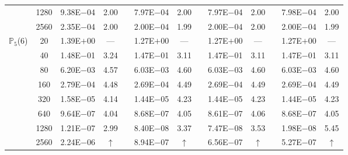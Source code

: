\begin{table}[H]
{\begin{tabular}{@{}l c c c c c c c c c c c c@{}}
 & 1280 & 9.38E$-$04 & 2.00 &  & 7.97E$-$04 & 2.00 &  & 7.97E$-$04 & 2.00 &  & 7.98E$-$04 & 2.00\\
 & 2560 & 2.35E$-$04 & 2.00 &  & 2.00E$-$04 & 1.99 &  & 2.00E$-$04 & 2.00 &  & 2.00E$-$04 & 1.99\\
\midrule
\multirow{8}{*}{$\mathbb{P}_{5}$(6)}
 & 20 & 1.39E$+$00 & --- &  & 1.27E$+$00 & --- &  & 1.27E$+$00 & --- &  & 1.27E$+$00 & ---\\
 & 40 & 1.48E$-$01 & 3.24 &  & 1.47E$-$01 & 3.11 &  & 1.47E$-$01 & 3.11 &  & 1.47E$-$01 & 3.11\\
 & 80 & 6.20E$-$03 & 4.57 &  & 6.03E$-$03 & 4.60 &  & 6.03E$-$03 & 4.60 &  & 6.03E$-$03 & 4.60\\
 & 160 & 2.79E$-$04 & 4.48 &  & 2.69E$-$04 & 4.49 &  & 2.69E$-$04 & 4.49 &  & 2.69E$-$04 & 4.49\\
 & 320 & 1.58E$-$05 & 4.14 &  & 1.44E$-$05 & 4.23 &  & 1.44E$-$05 & 4.23 &  & 1.44E$-$05 & 4.23\\
 & 640 & 9.64E$-$07 & 4.04 &  & 8.68E$-$07 & 4.05 &  & 8.61E$-$07 & 4.06 &  & 8.68E$-$07 & 4.05\\
 & 1280 & 1.21E$-$07 & 2.99 &  & 8.40E$-$08 & 3.37 &  & 7.47E$-$08 & 3.53 &  & 1.98E$-$08 & 5.45\\
 & 2560 & 2.24E$-$06 & $\uparrow$ &  & 8.94E$-$07 & $\uparrow$ &  & 6.56E$-$07 & $\uparrow$ &  & 5.27E$-$07 & $\uparrow$\\
\bottomrule
\end{tabular}}
\label{PRO:bending:01_01_glob6_pro3}
\end{table}
